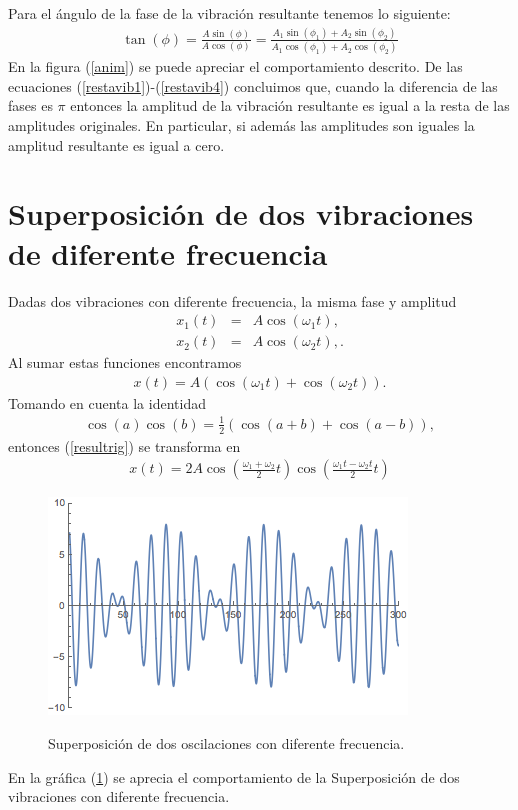 \documentclass[letterpaper,12pt,oneside]{book}
\begin{document}
%
Para el \'angulo de la fase de la vibraci\'on resultante tenemos lo siguiente:
%
\begin{eqnarray}
\tan(\phi)=\frac{A\sin(\phi)}{A\cos(\phi)}=\frac{A_1\sin(\phi_1)+A_2\sin(\phi_2)}{A_1\cos(\phi_1)+A_2\cos(\phi_2)}\nonumber
\end{eqnarray}
%
%
En la figura (\ref{anim}) se puede apreciar el comportamiento descrito.
%
De las ecuaciones (\ref{restavib1})-(\ref{restavib4}) concluimos que, cuando la diferencia de las fases es $\pi$ entonces la amplitud de la vibraci\'on resultante es igual a la resta de las amplitudes originales. En particular, si además las amplitudes son iguales la amplitud resultante es igual a cero. 
\section{Superposici\'on de dos vibraciones de diferente frecuencia}
%
Dadas dos vibraciones con diferente frecuencia, la misma fase  y amplitud
%
\begin{eqnarray}
x_1(t)&=& A\cos(\omega_1 t),\nonumber\\
x_2(t)&=&A\cos(\omega_2 t),\nonumber.
\end{eqnarray}
%
Al sumar estas funciones encontramos 
%
\begin{eqnarray}
x(t)=A\left(  \cos(\omega_1 t)+\cos(\omega_2 t)\right).
\label{resultrig}
\end{eqnarray}
%
Tomando en cuenta la identidad 
%
\begin{eqnarray}
\cos(a) \cos(b)=\frac{1}{2} \left( \cos(a+b)+ \cos(a-b)\right),
\end{eqnarray}
%
entonces (\ref{resultrig}) se transforma en
%
\begin{eqnarray}
x(t)= 2A\cos \left( \frac{\omega_1  +\omega_2}{2} t \right) \cos\left( \frac{\omega_1 t-\omega_2 t}{2} t \right) \nonumber
\end{eqnarray}
% 
\begin{figure}
\centering
\includegraphics[scale=0.8]{fig/2diferentefrecuencia}
\label{fig:dosdiferentefrecuencia}
\caption{Superposici\'on de dos oscilaciones con diferente frecuencia.  }
\end{figure}
%
En la gr\'afica (\ref{fig:dosdiferentefrecuencia}) se aprecia el comportamiento de la Superposici\'on de dos vibraciones con diferente frecuencia.
\end{document}
